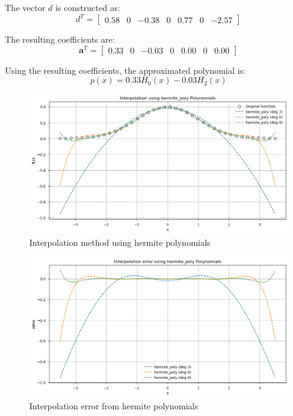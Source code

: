 \documentclass[10pt]{article}
\begin{document}
The vector \( d \) is constructed as:
\[
d^T = \begin{bmatrix}
0.58 & 0 & -0.38 & 0 & 0.77 & 0 & -2.57
\end{bmatrix}
\]

The resulting coefficients are:
\[
\mathbf{a}^T = \begin{bmatrix}
0.33 & 0 & -0.03 & 0 & 0.00 & 0 & 0.00
\end{bmatrix}
\]

Using the resulting coefficients, the approximated polynomial is:
\begin{equation}
p(x) = 0.33 H_0(x) - 0.03 H_2(x)
\end{equation}


\begin{figure}[H]
    \centering
    \includegraphics[width=\imagewidth\textwidth]{figures/02_interpolation/interpolation_method_hermite_poly.png}
    \caption{Interpolation method using hermite polynomials}
\end{figure}
\begin{figure}[H]
    \centering
    \includegraphics[width=\imagewidth\textwidth]{figures/02_interpolation/interpolation_error_method_hermite_poly.png}
    \caption{Interpolation error from hermite polynomials}
\end{figure}
\end{document}
